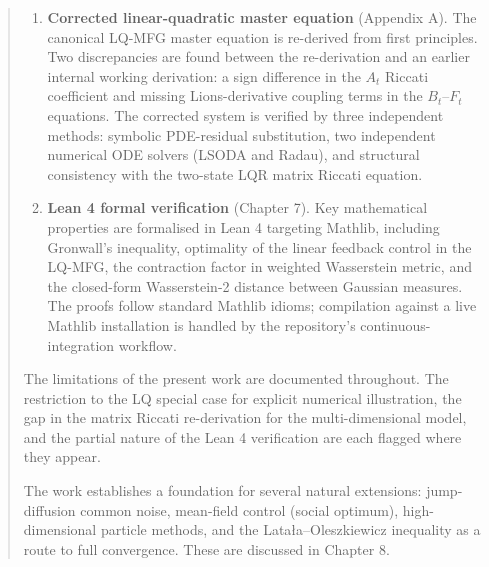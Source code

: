 \begin{abstract}
\begin{enumerate}
    \item \textbf{Corrected linear-quadratic master equation} (Appendix A).
    The canonical LQ-MFG master equation is re-derived from first principles.
    Two discrepancies are found between the re-derivation and an earlier internal
    working derivation: a sign difference in the $A_t$ Riccati coefficient and
    missing Lions-derivative coupling terms in the $B_t$--$F_t$ equations. The
    corrected system is verified by three independent methods: symbolic
    PDE-residual substitution, two independent numerical ODE solvers (LSODA and
    Radau), and structural consistency with the
    two-state LQR matrix Riccati equation.

    \item \textbf{Lean 4 formal verification} (Chapter 7).
    Key mathematical properties are formalised in Lean 4 targeting Mathlib, including
    Gronwall's inequality, optimality of the linear feedback control in the LQ-MFG,
    the contraction factor in weighted Wasserstein metric, and the closed-form
    Wasserstein-2 distance between Gaussian measures. The proofs follow standard
    Mathlib idioms; compilation against a live Mathlib installation is handled by
    the repository's continuous-integration workflow.
\end{enumerate}

The limitations of the present work are documented throughout. The restriction to
the LQ special case for explicit numerical illustration, the gap in the matrix
Riccati re-derivation for the multi-dimensional model, and the partial nature of
the Lean 4 verification are each flagged where they appear.

The work establishes a foundation for several natural extensions: jump-diffusion
common noise, mean-field control (social optimum), high-dimensional particle methods,
and the Lata\l{}a--Oleszkiewicz inequality as a route to full convergence. These are discussed in Chapter 8.

\end{abstract}
